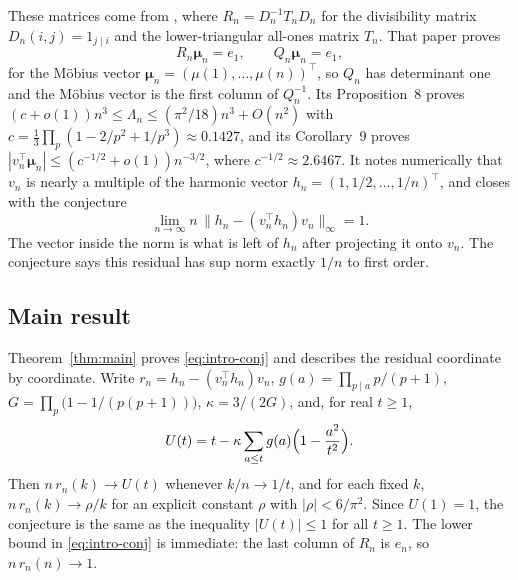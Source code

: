 \documentclass[11pt]{article}
\theoremstyle{remark}\newtheorem{remark}[theorem]{Remark}
\newcommand{\muvec}{\boldsymbol\mu}
\begin{document}
These matrices come from \cite{kline}, where $R_n=D_n^{-1}T_nD_n$ for the divisibility matrix $D_n(i,j)=1_{j\mid i}$ and the lower-triangular all-ones matrix $T_n$. That paper proves
\[
 R_n\muvec_n=e_1,\qquad Q_n\muvec_n=e_1,
\]
for the M\"obius vector $\muvec_n=(\mu(1),\ldots,\mu(n))^\top$, so $Q_n$ has determinant one and the M\"obius vector is the first column of $Q_n^{-1}$. Its Proposition~8 proves $(c+o(1))n^3\le\Lambda_n\le(\pi^2/18)n^3+O(n^2)$ with $c=\frac13\prod_p(1-2/p^2+1/p^3)\approx0.1427$, and its Corollary~9 proves $|v_n^\top\muvec_n|\le(c^{-1/2}+o(1))n^{-3/2}$, where $c^{-1/2}\approx2.6467$. It notes numerically that $v_n$ is nearly a multiple of the harmonic vector $h_n=(1,1/2,\ldots,1/n)^\top$, and closes with the conjecture
\begin{equation}\label{eq:intro-conj}
 \lim_{n\to\infty}n\,\bigl\|h_n-(v_n^\top h_n)v_n\bigr\|_\infty=1.
\end{equation}
The vector inside the norm is what is left of $h_n$ after projecting it onto $v_n$. The conjecture says this residual has sup norm exactly $1/n$ to first order.

\subsection*{Main result}
Theorem~\ref{thm:main} proves \eqref{eq:intro-conj} and describes the residual coordinate by coordinate. Write $r_n=h_n-(v_n^\top h_n)v_n$, $g(a)=\prod_{p\mid a}p/(p+1)$, $G=\prod_p\bigl(1-1/(p(p+1))\bigr)$, $\kappa=3/(2G)$, and, for real $t\ge1$,
\[
 U(t)=t-\kappa\sum_{a\le t}g(a)\Bigl(1-\frac{a^2}{t^2}\Bigr).
\]
Then $n\,r_n(k)\to U(t)$ whenever $k/n\to1/t$, and for each fixed $k$, $n\,r_n(k)\to\rho/k$ for an explicit constant $\rho$ with $|\rho|<6/\pi^2$. Since $U(1)=1$, the conjecture is the same as the inequality $|U(t)|\le1$ for all $t\ge1$. The lower bound in \eqref{eq:intro-conj} is immediate: the last column of $R_n$ is $e_n$, so $n\,r_n(n)\to1$.
\end{document}
